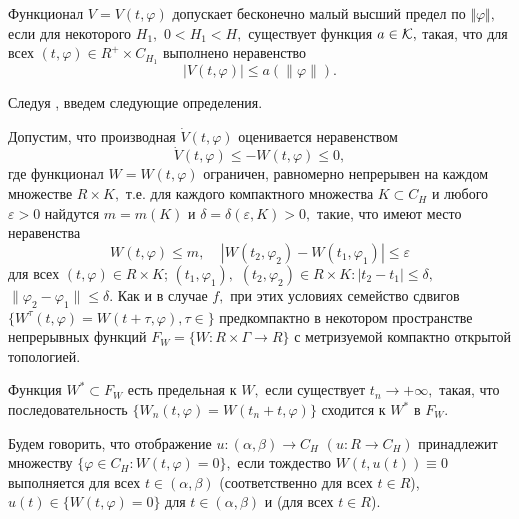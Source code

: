 \begin{definition}\label{d2.10} Функционал $V=V(t,\varphi )$ допускает бесконечно
	малый высший предел по $\Vert \varphi \Vert,$ если для некоторого
	$H_1,$ $0<H_1<H,$ существует функция $a\in {\cal K},$ такая, что
	для всех  $(t,\varphi) \in R^+\times C_{H_1}$ выполнено
	неравенство $$ |V(t,\varphi )|\le a(\|\varphi\| ). $$
\end{definition}

Следуя \cite{}, введем следующие определения.

Допустим, что производная $\dot V(t,\varphi )$ оценивается неравенством
\begin{equation}
\dot V(t,\varphi )\le -W(t,\varphi )\le 0, \label{3.3'}
\end{equation}
где функционал $W=W(t,\varphi )$ ограничен, равномерно непрерывен
на каждом множестве $R \times K,$ т.е. для каждого компактного
множества $K\subset C_H$ и любого $\varepsilon >0$ найдутся
$m=m(K)$ и $\delta =\delta (\varepsilon ,K)>0,$ такие, что имеют
место неравенства
\begin{equation}
W(t,\varphi )\le m,\ \ \ \ \ |W(t_2,\varphi _2)-W(t_1,\varphi
_1)|\le\varepsilon \label{3.4'}
\end{equation}
для всех $(t,\varphi )\in R \times K$; $(t_1,\varphi _1),$
$(t_2,\varphi _2)\in R \times K : |t_2-t_1|\le \delta,$
$\|\varphi _2-\varphi _1\|\le\delta.$
Как и в случае $f,$ при этих  условиях семейство сдвигов $\{
W^{\tau }(t,\varphi )=W(t+\tau ,\varphi ), \tau\in \}$
предкомпактно в некотором пространстве непрерывных функций
$F_{W}=\{ W : R\times\Gamma\to R\}$  с метризуемой компактно
открытой топологией.

\begin{definition}\label{d-3.1} Функция $W^*\subset F_W$ есть предельная к $W,$  если
	существует $t_n\to +\infty, $  такая,  что  последовательность $\{
	W_n(t,\varphi )=W(t_n+t,\varphi )\}$ сходится к $W^*$  в $F_{W}.$
\end{definition}

\begin{definition}\label{d-3.2} Будем говорить, что отображение
	$u : (\alpha ,\beta )\to C_{H}$ $(u : R\to C_{H})$ принадлежит
	множеству $\{ \varphi\in C_{H} : W(t,\varphi )=0 \},$ если
	тождество $W(t,u(t))\equiv 0$ выполняется для всех $t\in (\alpha
	,\beta )$ (соответственно для всех $t\in R$), $u(t)\in \{
	W(t,\varphi )=0\}$ для  $t\in (\alpha ,\beta )$ и (для всех $t\in
	R$).
\end{definition}

